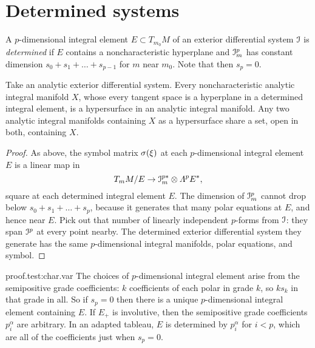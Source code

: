 \section{Determined systems}
A \(p\)-dimensional integral element \(E\subset T_{m_0} M\) of an exterior differential system \(\mathcal{I}\) is \emph{determined} if \(E\) contains a noncharacteristic hyperplane and \(\mathcal{I}^p_m\) has constant dimension \(s_0+s_1+\dots+s_{p-1}\) for \(m\) near \(m_0\).
Note that then \(s_p=0\).
\begin{theorem}\label{theorem:CKbaby}
Take an analytic exterior differential system.
Every noncharacteristic analytic integral manifold \(X\), whose every tangent space is a hyperplane in a determined integral element, is a hypersurface in an analytic integral manifold.
Any two analytic integral manifolds containing \(X\) as a hypersurface share a set, open in both, containing \(X\).
\end{theorem}
\begin{proof}
As above, the symbol matrix \(\opsymbol[]{\xi}\) at each \(p\)-dimensional integral element \(E\) is a linear map in
\[
T_m M/E \to \II^{p*}_m \otimes \Lm{p}{E^*},
\]
square at each determined integral element \(E\).
The dimension of \(\mathcal{I}^p_m\) cannot drop below \(s_0+s_1+\dots+s_p\), because it generates that many polar equations at \(E\), and hence near \(E\).
Pick out that number of linearly independent \(p\)-forms from \(\mathcal{I}\): they span \(\mathcal{I}^p\) at every point nearby.
The determined exterior differential system they generate has the same \(p\)-dimensional integral manifolds, polar equations, and symbol.
\end{proof}
\begin{answer}{proof.test:char.var}
The choices of \(p\)-dimensional integral element arise from the semipositive grade coefficients: \(k\) coefficients of each polar in grade \(k\), so \(ks_k\) in that grade in all.
So if \(s_p=0\) then there is a unique \(p\)-dimensional integral element containing \(E\).
If \(E_+\) is involutive, then the semipositive grade coefficients \(p^{\alpha}_i\) are arbitrary.
In an adapted tableau, \(E\) is determined by \(p^{\alpha}_i\) for \(i<p\), which are all of the coefficients just when \(s_p=0\).
\end{answer}
